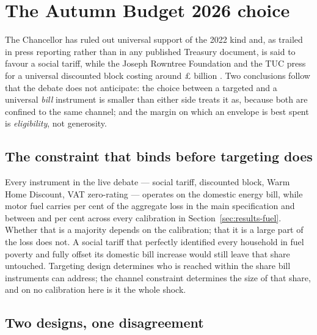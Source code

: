 \section{The Autumn Budget 2026 choice}
\label{sec:policy}

The Chancellor has ruled out universal support of the 2022 kind and, as trailed in press reporting rather than in any published Treasury document, is said to favour a social tariff, while the Joseph Rowntree Foundation and the TUC press for a universal discounted block costing around \pounds \genJrfStatedCostBn{} billion \citep{jrf2026}. Two conclusions follow that the debate does not anticipate: the choice between a targeted and a universal \emph{bill} instrument is smaller than either side treats it as, because both are confined to the same channel; and the margin on which an envelope is best spent is \emph{eligibility}, not generosity.

\subsection{The constraint that binds before targeting does}
\label{sec:policy-channel}

Every instrument in the live debate --- social tariff, discounted block, Warm Home Discount, VAT zero-rating --- operates on the domestic energy bill, while motor fuel carries \genMotorFuelShareOfLoss{} per cent of the aggregate loss in the main specification and between \genSpecFuelShareMinPct{} and \genSpecFuelShareMaxPct{} per cent across every calibration in Section~\ref{sec:results-fuel}. Whether that is a majority depends on the calibration; that it is a large part of the loss does not. A social tariff that perfectly identified every household in fuel poverty and fully offset its domestic bill increase would still leave that share untouched. Targeting design determines who is reached within the share bill instruments can address; the channel constraint determines the size of that share, and on no calibration here is it the whole shock.

\subsection{Two designs, one disagreement}

